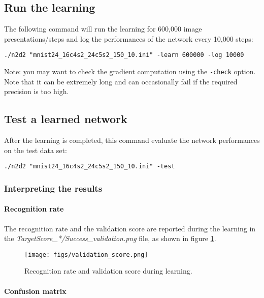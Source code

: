 \documentclass[a4paper,11pt,oneside]{article}
\begin{document}
\subsection{Run the learning}

The following command will run the learning for 600,000 image
presentations/steps and log the performances of the network every 10,000 steps:
\begin{lstlisting}
./n2d2 "mnist24_16c4s2_24c5s2_150_10.ini" -learn 600000 -log 10000
\end{lstlisting}

Note: you may want to check the gradient computation using the
 \lstinline!-check! option. Note that it can be extremely long and can
occasionally fail if the required precision is too high.

\subsection{Test a learned network}

After the learning is completed, this command evaluate the network performances
 on the test data set:
\begin{lstlisting}
./n2d2 "mnist24_16c4s2_24c5s2_150_10.ini" -test
\end{lstlisting}


\subsubsection{Interpreting the results}

\paragraph{Recognition rate}

The recognition rate and the validation score are reported during the learning
 in the \emph{TargetScore\_*/Success\_validation.png} file, as shown in
 figure \ref{fig:validationScore}.

\begin{figure}[!htb]
  \centering
  \texttt{[image: figs/validation\_score.png]}
  \caption{Recognition rate and validation score during learning.}
  \label{fig:validationScore}
\end{figure}

\paragraph{Confusion matrix}
\end{document}
